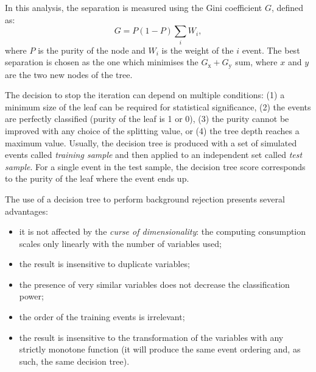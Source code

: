 In this analysis, the separation is measured using the Gini coefficient $G$, defined as:
\begin{equation}
    G = P(1-P)\sum_i W_i,
\end{equation}
where $P$ is the purity of the node and $W_i$ is the weight of the $i$ event. The best separation is chosen as the one which minimises the $G_{\mathrm{x}}+G_{\mathrm{y}}$ sum, where $x$ and $y$ are the two new nodes of the tree.

The decision to stop the iteration can depend on multiple conditions: (1) a minimum size of the leaf can be required for statistical significance, (2) the events are perfectly classified (purity of the leaf is 1 or 0), (3) the purity cannot be improved with any choice of the splitting value, or (4) the tree depth reaches a maximum value. 
Usually, the decision tree is produced with a set of simulated events called \emph{training sample} and then applied to an independent set called \emph{test sample}.
For a single event in the test sample, the decision tree score corresponds to the purity of the leaf where the event ends up. 

The use of a decision tree to perform background rejection presents several advantages: 
\begin{itemize}
    \item it is not affected by the \emph{curse of dimensionality}: the computing consumption scales only linearly with the number of variables used;
    \item the result is insensitive to duplicate variables;
    \item the presence of very similar variables does not decrease the classification power;
    \item the order of the training events is irrelevant;
    \item the result is insensitive to the transformation of the variables with any strictly monotone function (it will produce the same event ordering and, as such, the same decision tree).
\end{itemize}


